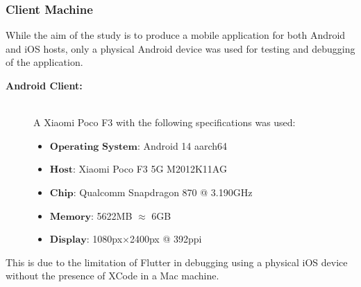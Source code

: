 \documentclass[journal]{./IEEE/IEEEtran}
\begin{document}
\subsubsection{\textbf{Client Machine}}
While the aim of the study is to produce a mobile application for both Android and iOS hosts, only a physical Android device was used for testing and debugging of the application. 
\begin{description}
    \item[\textbf{Android Client:}] \hfill \\
        A Xiaomi Poco F3 with the following specifications was used:
        \begin{itemize}
            \item $\textbf{Operating System:}$ Android 14 aarch64
            \item $\textbf{Host:}$ Xiaomi Poco F3 5G M2012K11AG
            \item $\textbf{Chip:}$ Qualcomm Snapdragon 870 @ 3.190GHz 
            \item $\textbf{Memory:}$ 5622MB $\approx$ 6GB
            \item $\textbf{Display:}$ 1080px$\times$2400px @ 392ppi 
        \end{itemize}




\end{description}

This is due to the limitation of Flutter in debugging using a physical iOS device without the presence of XCode in a Mac machine.
\end{document}
